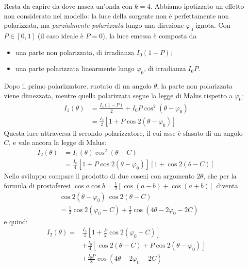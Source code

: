 \documentclass[10pt,twocolumn]{article}
\begin{document}
      Resta da capire da dove nasca un'onda con $k = 4$. Abbiamo ipotizzato un effetto non considerato nel modello: la luce della sorgente non è perfettamente non polarizzata, ma
      \emph{parzialmente polarizzata} lungo una direzione $\varphi_0$ ignota. Con $P \in [0,1]$ (il caso ideale è $P = 0$), la luce emessa è composta da
      \begin{itemize}
        \item una parte non polarizzata, di irradianza $I_0(1-P)$;
        \item una parte polarizzata linearmente lungo $\varphi_0$, di irradianza $I_0 P$.
      \end{itemize}
      Dopo il primo polarizzatore, ruotato di un angolo $\theta$, la parte non polarizzata viene dimezzata, mentre quella polarizzata segue la legge di Malus rispetto a $\varphi_0$:
      \begin{align*}
          I_1(\theta) &= \frac{I_0(1-P)}{2} + I_0 P\cos^2(\theta - \varphi_0) \\
                      &= \frac{I_0}{2}\left[ 1 + P\cos 2(\theta - \varphi_0) \right]
      \end{align*}
      Questa luce attraversa il secondo polarizzatore, il cui asse è sfasato di un angolo $C$, e vale ancora la legge di Malus:
      \begin{align*}
          I_2(\theta) &= I_1(\theta)\cos^2(\theta - C) \\
                      &= \frac{I_0}{4}\left[ 1 + P\cos 2(\theta - \varphi_0) \right]\left[ 1 + \cos 2(\theta - C) \right]
        \end{align*}
      Nello sviluppo compare il prodotto di due coseni con argomento $2\theta$, che per la formula di prostaferesi $\cos a\cos b = \tfrac{1}{2}\left[ \cos(a-b) + \cos(a+b) \right]$ diventa
      \begin{equation}
        \begin{split}
          & \cos 2(\theta - \varphi_0)\,\cos 2(\theta - C) \\
          & = \tfrac{1}{2}\cos 2(\varphi_0 - C) + \tfrac{1}{2}\cos(4\theta - 2\varphi_0 - 2C)
        \end{split}
      \end{equation}
      e quindi
      \begin{equation}
        \begin{split}
          I_2(\theta) = {}& \frac{I_0}{4}\left[ 1 + \frac{P}{2}\cos 2(\varphi_0 - C) \right] \\
          & + \frac{I_0}{4}\left[ \cos 2(\theta - C) + P\cos 2(\theta - \varphi_0) \right] \\
          & + \frac{I_0 P}{8}\cos(4\theta - 2\varphi_0 - 2C)
        \end{split}
      \label{eq:6}
      \end{equation}
\end{document}
